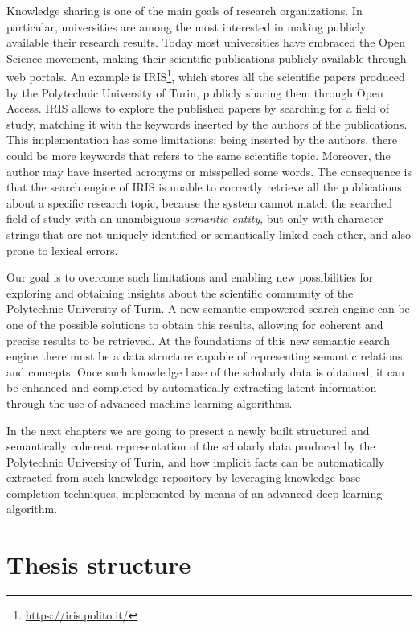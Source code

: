 \documentclass[%
    corpo=13.5pt,
    twoside,
    oldstyle,
    tipotesi=magistrale,
    greek,
    evenboxes
]{toptesi}
\begin{document}
Knowledge sharing is one of the main goals of research organizations. In
particular, universities are among the most interested in making publicly
available their research results. Today most universities have embraced the Open
Science movement, making their scientific publications publicly available
through web portals.
An example is IRIS\footnote{\url{https://iris.polito.it/}}, which
stores all the scientific papers produced by the Polytechnic University of
Turin, publicly sharing them through Open Access.
IRIS allows to explore the published papers by searching for a field of study,
matching it with the keywords inserted by the authors of the publications.
This implementation has some limitations: being inserted by the authors, there
could be more keywords that refers to the same scientific topic.
Moreover, the author may have inserted acronyms or misspelled some words.
The consequence is that the search engine of IRIS is unable to correctly
retrieve all the publications about a specific research topic, because the
system cannot match the searched field of study with an unambiguous
\emph{semantic entity}, but only with character strings that are not
uniquely identified or semantically linked each other, and also prone to
lexical errors.

Our goal is to overcome such limitations and enabling new possibilities for
exploring and obtaining insights about the scientific community of the
Polytechnic University of Turin. A new semantic-empowered search engine can be
one of the possible solutions to obtain this results, allowing for coherent and
precise results to be retrieved.
At the foundations of this new semantic search engine there must be a data
structure capable of representing semantic relations and concepts. Once such
knowledge base of the scholarly data is obtained, it can be enhanced and
completed by automatically extracting latent information through the use of
advanced machine learning algorithms.

In the next chapters we are going to present a newly built structured and
semantically coherent representation of the scholarly data produced by the
Polytechnic University of Turin, and how implicit facts can be automatically
extracted from such knowledge repository by leveraging knowledge base
completion techniques, implemented by means of an advanced deep learning
algorithm.


\section{Thesis structure}
\end{document}
